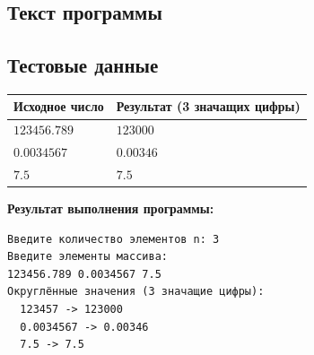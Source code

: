 \subsection{Текст программы}



\subsection{Тестовые данные}

\begin{center}
\begin{tabular}{l|l}
\toprule
Исходное число & Результат (3 значащих цифры) \\
\midrule
$123456.789$ & $123000$ \\
$0.0034567$ & $0.00346$ \\
$7.5$ & $7.5$ \\
\bottomrule
\end{tabular}
\end{center}

\textbf{Результат выполнения программы:}
\begin{lstlisting}[language={},basicstyle=\ttfamily\small,frame=single]
Введите количество элементов n: 3
Введите элементы массива:
123456.789 0.0034567 7.5
Округлённые значения (3 значащие цифры):
  123457 -> 123000
  0.0034567 -> 0.00346
  7.5 -> 7.5
\end{lstlisting}
